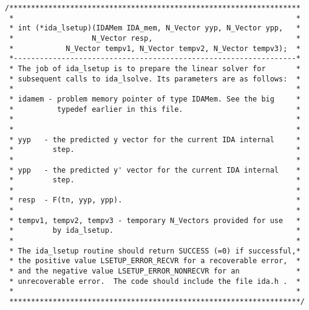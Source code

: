 \documentclass[11pt]{article}
\begin{document}
\begin{verbatim}
/*******************************************************************
 *                                                                 *
 * int (*ida_lsetup)(IDAMem IDA_mem, N_Vector yyp, N_Vector ypp,   *
 *                  N_Vector resp,                                 *
 *            N_Vector tempv1, N_Vector tempv2, N_Vector tempv3);  *
 *-----------------------------------------------------------------*
 * The job of ida_lsetup is to prepare the linear solver for       *
 * subsequent calls to ida_lsolve. Its parameters are as follows:  *
 *                                                                 *
 * idamem - problem memory pointer of type IDAMem. See the big     *
 *          typedef earlier in this file.                          *
 *                                                                 *
 *                                                                 *
 * yyp   - the predicted y vector for the current IDA internal     *
 *         step.                                                   *
 *                                                                 *
 * ypp   - the predicted y' vector for the current IDA internal    *
 *         step.                                                   *
 *                                                                 *
 * resp  - F(tn, yyp, ypp).                                        *
 *                                                                 *
 * tempv1, tempv2, tempv3 - temporary N_Vectors provided for use   *
 *         by ida_lsetup.                                          *
 *                                                                 *
 * The ida_lsetup routine should return SUCCESS (=0) if successful,*
 * the positive value LSETUP_ERROR_RECVR for a recoverable error,  *
 * and the negative value LSETUP_ERROR_NONRECVR for an             *
 * unrecoverable error.  The code should include the file ida.h .  *
 *                                                                 *
 *******************************************************************/


\end{verbatim}
\end{document}
